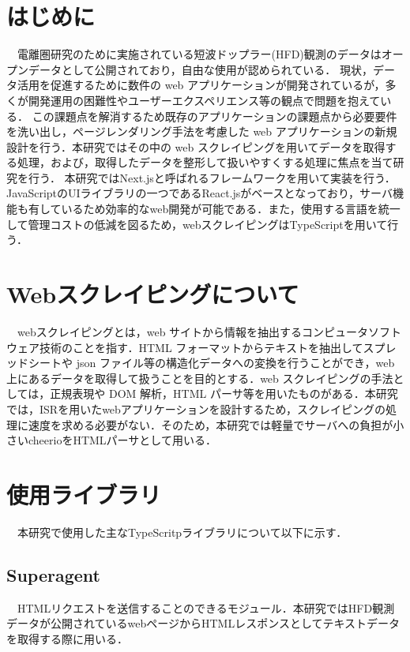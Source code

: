\section{はじめに}

　電離圏研究のために実施されている短波ドップラー(HFD)観測のデータはオープンデータとして公開されており，自由な使用が認められている．
現状，データ活用を促進するために数件の web アプリケーションが開発されているが，多くが開発運用の困難性やユーザーエクスペリエンス等の観点で問題を抱えている．
 この課題点を解消するため既存のアプリケーションの課題点から必要要件を洗い出し，ページレンダリング手法を考慮した web アプリケーションの新規設計を行う．本研究ではその中の web スクレイピングを用いてデータを取得する処理，および，取得したデータを整形して扱いやすくする処理に焦点を当て研究を行う．
本研究ではNext.jsと呼ばれるフレームワークを用いて実装を行う．JavaScriptのUIライブラリの一つであるReact.jsがベースとなっており，サーバ機能も有しているため効率的なweb開発が可能である．また，使用する言語を統一して管理コストの低減を図るため，webスクレイピングはTypeScriptを用いて行う．
\section{Webスクレイピングについて}

　webスクレイピングとは，web サイトから情報を抽出するコンピュータソフトウェア技術のことを指す．HTML フォーマットからテキストを抽出してスプレッドシートや json ファイル等の構造化データへの変換を行うことができ，web 上にあるデータを取得して扱うことを目的とする．web スクレイピングの手法としては，正規表現や DOM 解析，HTML パーサ等を用いたものがある．本研究では，ISRを用いたwebアプリケーションを設計するため，スクレイピングの処理に速度を求める必要がない．そのため，本研究では軽量でサーバへの負担が小さいcheerioをHTMLパーサとして用いる．
\section{使用ライブラリ}
　本研究で使用した主なTypeScritpライブラリについて以下に示す．
\subsection{Superagent}

　HTMLリクエストを送信することのできるモジュール．本研究ではHFD観測データが公開されているwebページからHTMLレスポンスとしてテキストデータを取得する際に用いる．\cite{superagent}
